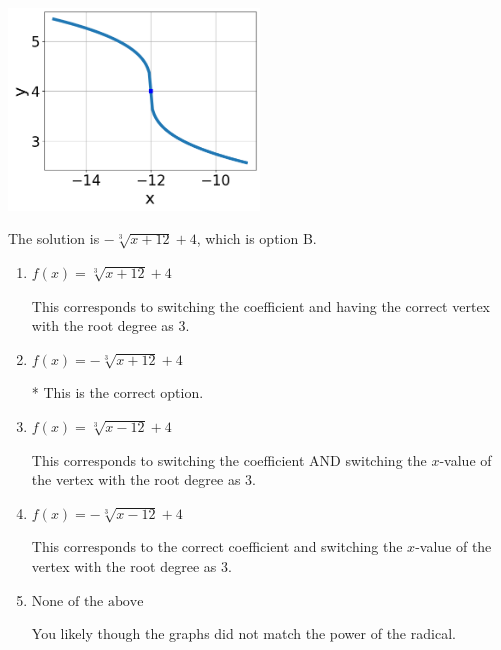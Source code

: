 \documentclass{extbook}[14pt]
\begin{document}
\begin{enumerate}
{\begin{center}
    \includegraphics[width=0.5\textwidth]{../Figures/radicalGraphToEquationCopyC.png}
\end{center}


The solution is \( - \sqrt[3]{x + 12} + 4 \), which is option B.\begin{enumerate}[label=\Alph*.]
\item \( f(x) = \sqrt[3]{x + 12} + 4 \)

This corresponds to switching the coefficient and having the correct vertex with the root degree as $3$.
\item \( f(x) = - \sqrt[3]{x + 12} + 4 \)

* This is the correct option.
\item \( f(x) = \sqrt[3]{x - 12} + 4 \)

This corresponds to switching the coefficient AND switching the $x$-value of the vertex with the root degree as $3$.
\item \( f(x) = - \sqrt[3]{x - 12} + 4 \)

This corresponds to the correct coefficient and switching the $x$-value of the vertex with the root degree as $3$.
\item \( \text{None of the above} \)

You likely though the graphs did not match the power of the radical.
\end{enumerate}

}
\end{enumerate}
\end{document}
